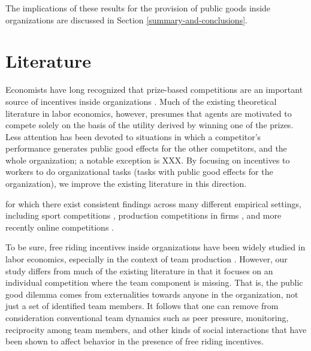 \documentclass[12pt, titlepage]{article}
\begin{document}
The implications of these results for the provision of public goods
inside organizations are discussed in Section
\ref{summary-and-conclusions}.

\section{Literature}\label{literature}

Economists have long recognized that prize-based competitions are an
important source of incentives inside organizations
\citep{lazear1981rank, green1983comparison, nalebuff1983prizes, mary1984economic}.
Much of the existing theoretical literature in labor economics, however,
presumes that agents are motivated to compete solely on the basis of the
utility derived by winning one of the prizes. Less attention has been
devoted to situations in which a competitor's performance generates
public good effects for the other competitors, and the whole
organization; a notable exception is XXX. By focusing on incentives to
workers to do organizational tasks (tasks with public good effects for
the organization), we improve the existing literature in this direction.

for which there exist consistent findings across many different
empirical settings, including sport competitions
\citep{ehrenberg1990tournaments}, production competitions in firms
\citep{knoeber1994testing, terwiesch2008innovation}, and more recently
online competitions
\citep{boudreau2011incentives, boudreau2016performance}.

To be sure, free riding incentives inside organizations have been widely
studied in labor economics, especially in the context of team production
\citep{erev1993constructive, hamilton2003team, boning2007opportunity, gibbs2014field}.
However, our study differs from much of the existing literature in that
it focuses on an individual competition where the team component is
missing. That is, the public good dilemma comes from externalities
towards anyone in the organization, not just a set of identified team
members. It follows that one can remove from consideration conventional
team dynamics such as peer pressure, monitoring, reciprocity among team
members, and other kinds of social interactions that have been shown to
affect behavior in the presence of free riding incentives.
\end{document}
